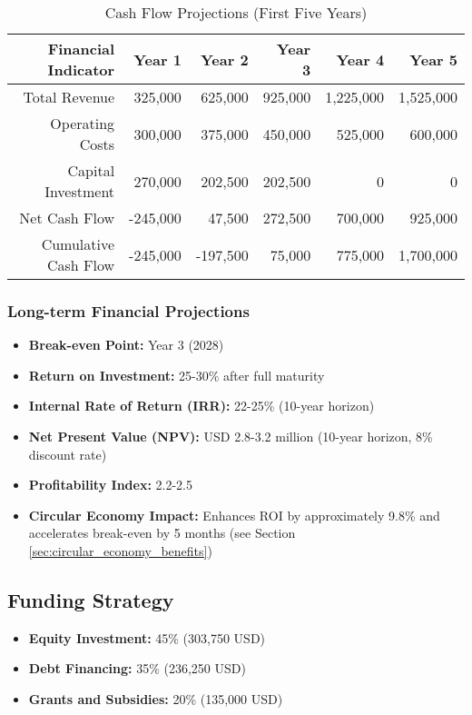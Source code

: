 \begin{table}[h]
\centering
\begin{tabular}{|r|r|r|r|r|r|}
\hline
\textbf{Financial Indicator} & \textbf{Year 1} & \textbf{Year 2} & \textbf{Year 3} & \textbf{Year 4} & \textbf{Year 5} \\
\hline
Total Revenue & 325,000 & 625,000 & 925,000 & 1,225,000 & 1,525,000 \\
Operating Costs & 300,000 & 375,000 & 450,000 & 525,000 & 600,000 \\
Capital Investment & 270,000 & 202,500 & 202,500 & 0 & 0 \\
\hline
Net Cash Flow & -245,000 & 47,500 & 272,500 & 700,000 & 925,000 \\
Cumulative Cash Flow & -245,000 & -197,500 & 75,000 & 775,000 & 1,700,000 \\
\hline
\end{tabular}
\caption{Cash Flow Projections (First Five Years)}
\end{table}

\subsubsection{Long-term Financial Projections}
\begin{itemize}
    \item \textbf{Break-even Point:} Year 3 (2028)
    \item \textbf{Return on Investment:} 25-30\% after full maturity
    \item \textbf{Internal Rate of Return (IRR):} 22-25\% (10-year horizon)
    \item \textbf{Net Present Value (NPV):} USD 2.8-3.2 million (10-year horizon, 8\% discount rate)
    \item \textbf{Profitability Index:} 2.2-2.5
    \item \textbf{Circular Economy Impact:} Enhances ROI by approximately 9.8\% and accelerates break-even by 5 months (see Section \ref{sec:circular_economy_benefits})
\end{itemize}

\subsection{Funding Strategy}
\begin{itemize}
    \item \textbf{Equity Investment:} 45\% (303,750 USD)
    \item \textbf{Debt Financing:} 35\% (236,250 USD)
    \item \textbf{Grants and Subsidies:} 20\% (135,000 USD)
\end{itemize}


